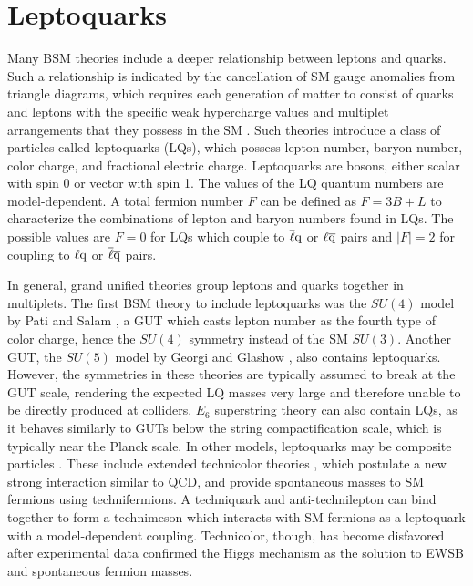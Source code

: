 \documentclass[12pt]{thesis}  %
\begin{document}
\section{Leptoquarks
\label{sec:LQ}}

Many BSM theories include a deeper relationship between leptons and quarks. Such a relationship is indicated by the cancellation of SM gauge anomalies from triangle diagrams, which requires each generation of matter to consist of quarks and leptons with the specific weak hypercharge values and multiplet arrangements that they possess in the SM \cite{Peskin}. Such theories introduce a class of particles called leptoquarks (LQs), which possess lepton number, baryon number, color charge, and fractional electric charge. Leptoquarks are bosons, either scalar with spin 0 or vector with spin 1. The values of the LQ quantum numbers are model-dependent. A total fermion number $F$ can be defined as $F = 3B + L$ to characterize the combinations of lepton and baryon numbers found in LQs. The possible values are $F=0$ for LQs which couple to $\overline{\ell}\mathrm{q}$ or $\ell\overline{\mathrm{q}}$ pairs and $|F|=2$ for coupling to $\ell\mathrm{q}$ or $\overline{\ell}\overline{\mathrm{q}}$ pairs.

In general, grand unified theories group leptons and quarks together in multiplets. The first BSM theory to include leptoquarks was the $SU(4)$ model by Pati and Salam \cite{SU4}, a GUT which casts lepton number as the fourth type of color charge, hence the $SU(4)$ symmetry instead of the SM $SU(3)$. Another GUT, the $SU(5)$ model by Georgi and Glashow \cite{GUT}, also contains leptoquarks. However, the symmetries in these theories are typically assumed to break at the GUT scale, rendering the expected LQ masses very large and therefore unable to be directly produced at colliders. $E_6$ superstring theory \cite{SUPERSTR} can also contain LQs, as it behaves similarly to GUTs below the string compactification scale, which is typically near the Planck scale. In other models, leptoquarks may be composite particles \cite{LQ3b}. These include extended technicolor theories \cite{TC3}, which postulate a new strong interaction similar to QCD, and provide spontaneous masses to SM fermions using technifermions. A techniquark and anti-technilepton can bind together to form a technimeson which interacts with SM fermions as a leptoquark with a model-dependent coupling. Technicolor, though, has become disfavored after experimental data confirmed the Higgs mechanism as the solution to EWSB and spontaneous fermion masses.
\end{document}
